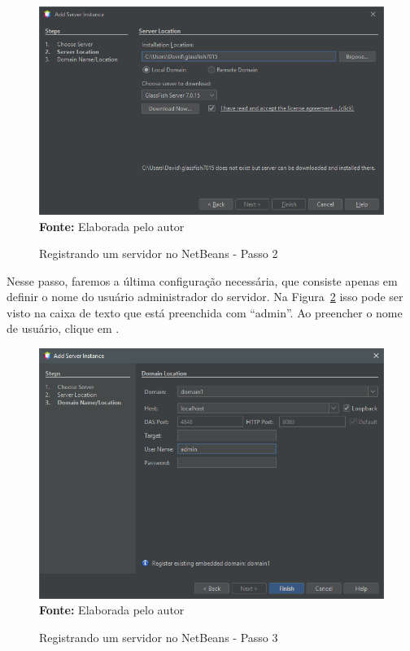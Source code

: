 \FloatBarrier
\begin{figure}[!htbp]
    \centering
    \caption{Registrando um servidor no NetBeans - Passo 2}
    \includegraphics[scale=0.7]{imagens/cap01AddServerInstanceP02}
    \\\textbf{Fonte:} Elaborada pelo autor
    \label{fig:cap01AddServerP02}
\end{figure}
\FloatBarrier

Nesse passo, faremos a última configuração necessária, que consiste apenas em definir o nome do usuário administrador do servidor. Na Figura~\ref{fig:cap01AddServerP03} isso pode ser visto na caixa de texto  que está preenchida com ``admin''. Ao preencher o nome de usuário, clique em .

\FloatBarrier
\begin{figure}[!htbp]
    \centering
    \caption{Registrando um servidor no NetBeans - Passo 3}
    \includegraphics[scale=0.7]{imagens/cap01AddServerInstanceP03}
    \\\textbf{Fonte:} Elaborada pelo autor
    \label{fig:cap01AddServerP03}
\end{figure}
\FloatBarrier

